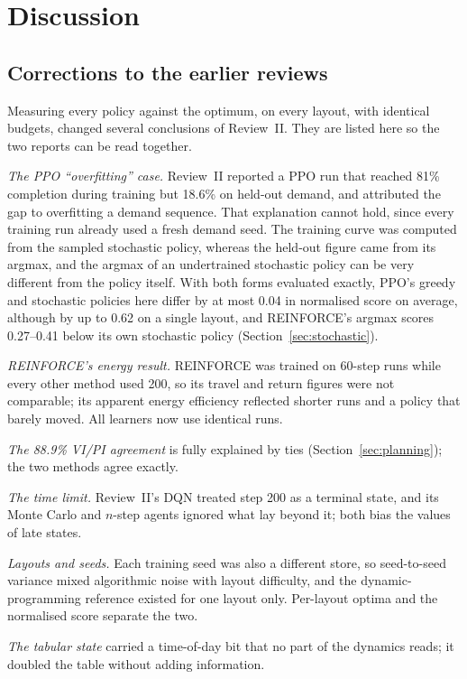 \section{Discussion}
\label{sec:discussion}

\subsection{Corrections to the earlier reviews}
Measuring every policy against the optimum, on every layout, with identical budgets, changed several conclusions of Review~II. They are listed here so the two reports can be read together.

\emph{The PPO ``overfitting'' case.} Review~II reported a PPO run that reached 81\% completion during training but 18.6\% on held-out demand, and attributed the gap to overfitting a demand sequence. That explanation cannot hold, since every training run already used a fresh demand seed. The training curve was computed from the sampled stochastic policy, whereas the held-out figure came from its argmax, and the argmax of an undertrained stochastic policy can be very different from the policy itself. With both forms evaluated exactly, PPO's greedy and stochastic policies here differ by at most 0.04 in normalised score on average, although by up to 0.62 on a single layout, and REINFORCE's argmax scores 0.27--0.41 below its own stochastic policy (Section~\ref{sec:stochastic}).

\emph{REINFORCE's energy result.} REINFORCE was trained on 60-step runs while every other method used 200, so its travel and return figures were not comparable; its apparent energy efficiency reflected shorter runs and a policy that barely moved. All learners now use identical runs.

\emph{The 88.9\% VI/PI agreement} is fully explained by ties (Section~\ref{sec:planning}); the two methods agree exactly.

\emph{The time limit.} Review~II's DQN treated step 200 as a terminal state, and its Monte Carlo and $n$-step agents ignored what lay beyond it; both bias the values of late states.

\emph{Layouts and seeds.} Each training seed was also a different store, so seed-to-seed variance mixed algorithmic noise with layout difficulty, and the dynamic-programming reference existed for one layout only. Per-layout optima and the normalised score separate the two.

\emph{The tabular state} carried a time-of-day bit that no part of the dynamics reads; it doubled the table without adding information.

